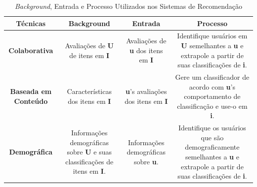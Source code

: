 \begin{table}[]
	\centering
	\caption{\emph{Background}, Entrada e Processo Utilizados nos Sistemas de Recomendação}
	\label{tab02}
	\begin{tabular}{|c|c|c|c|}
	\hline
	\rowcolor[HTML]{C0C0C0} 
	\textbf{Técnicas} & \textbf{Background} & \textbf{Entrada}  &  \textbf{Processo}  \\ \hline
	\textbf{Colaborativa} & \begin{minipage} [t] {0.2\textwidth} \centering Avaliações de \textbf{U} de itens em \textbf{I}  \end{minipage}  & \begin{minipage} [t] {0.2\textwidth} \centering Avaliações de \textbf{u} dos itens em \textbf{I} \end{minipage}  &  \begin{minipage} [t] {0.2\textwidth}  Identifique usuários em \textbf{U} semelhantes a \textbf{u} e extrapole a partir de suas classificações de \textbf{i}.   \end{minipage}    \\ \hline
	\rowcolor[HTML]{EFEFEF} 
	\textbf{Baseada em Conteúdo} & \begin{minipage} [t] {0.2\textwidth} \centering Características dos itens em \textbf{I}\end{minipage}  & \begin{minipage} [t] {0.2\textwidth} \textbf{u}'s avaliações dos itens em \textbf{I} \end{minipage}  &   \begin{minipage} [t] {0.2\textwidth} Gere um classificador de acordo com \textbf{u}'s comportamento de classificação e use-o em \textbf{i}. \end{minipage} \\ \hline
	\textbf{Demográfica} & \begin{minipage} [t] {0.2\textwidth} \centering Informações demográficas sobre \textbf{U} e suas classificações de itens em \textbf{I}.    \end{minipage}   & \begin{minipage} [t] {0.2\textwidth} Informações demográficas sobre \textbf{u}. \end{minipage}  & \begin{minipage} [t] {0.2\textwidth} Identifique os usuários que são demograficamente semelhantes a \textbf{u} e extrapole a partir de suas classificações de \textbf{i}. \end{minipage}   \\ \hline

\end{tabular}
\end{table}
